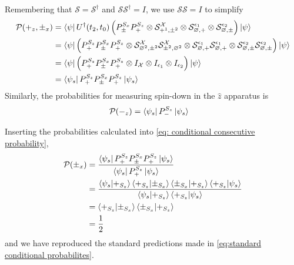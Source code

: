 Remembering that $\mathcal{S} = \mathcal{S}^\dagger$ and $\mathcal{S}\mathcal{S}^\dagger = I$, we use $\mathcal{S}\mathcal{S} = I$ to simplify
\begin{align}
  \mathcal{P}(+_z, \pm_x) &= \bra{\psi}  U^\dagger(t_2, t_0) \left(P^{S_x}_\pm P^{S_z}_+ \otimes \mathcal{S}^\mathcal{X}_{+^1, \pm^2 } \otimes \mathcal{S}^{\epsilon_1}_{\varnothing, +} \otimes \mathcal{S}^{\epsilon_2}_{\varnothing, \pm} \right) \ket{\psi} \\ \nonumber
  &= \bra{\psi} \left(P^{S_z}_+ P^{S_x}_\pm P^{S_z}_+ \otimes \mathcal{S}^\mathcal{X}_{\varnothing^2, \pm^2}\mathcal{S}^\mathcal{X}_{\pm^2, \varnothing^2} \otimes \mathcal{S}^{\epsilon_1}_{\varnothing, +} \mathcal{S}^{\epsilon_1}_{ \varnothing, +} \otimes \mathcal{S}^{\epsilon_2}_{\varnothing, \pm} \mathcal{S}^{\epsilon_2}_{\varnothing, \pm} \right) \ket{\psi} \\ \nonumber
  &= \bra{\psi} \left(P^{S_z}_+ P^{S_x}_\pm P^{S_z}_+ \otimes I_\mathcal{X}  \otimes I_{\epsilon_1} \otimes I_{\epsilon_2} \right) \ket{\psi} \\ \nonumber
  &= \bra{\psi_s} P^{S_z}_+ P^{S_x}_\pm P^{S_z}_+ \ket{\psi_s}
\end{align}
Similarly, the probabilities for measuring spin-down in the $\hat{z}$ apparatus is
\begin{align}
  \mathcal{P}(-_z) &= \bra{\psi_s} P^{S_z}_- \ket{\psi_s}
\end{align}

Inserting the probabilities calculated into \autoref{eq: conditional consecutive probability},
\begin{align}
    \mathcal{P}(\pm_x) &= \frac{\bra{\psi_s} P^{S_z}_+ P^{S_x}_\pm P^{S_z}_+ \ket{\psi_s}}{\bra{\psi_s} P^{S_z}_+ \ket{\psi_s}} \\ \nonumber
    &= \frac{\braket{\psi_s | +_{S_z}} \braket{+_{S_z}|\pm_{S_x}} \braket{\pm_{S_x}|+_{S_z}} \braket{+_{S_z}|\psi_s}}{\braket{\psi_s | +_{S_z}} \braket{+_{S_z}|\psi_s}} \\ \nonumber
    &= \braket{+_{S_z}|\pm_{S_x}} \braket{\pm_{S_x}|+_{S_z}} \\ \nonumber
    &= \frac{1}{2}
\end{align}
and we have reproduced the standard predictions made in \autoref{eq:standard conditional probabilites}.

